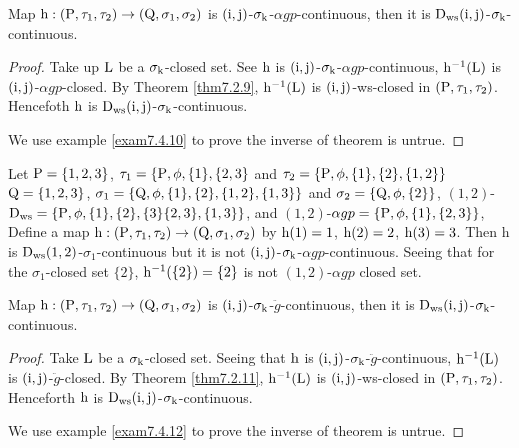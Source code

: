 \begin{thm}\label{thm7.4.9}
Map $\mathrm{h} :(\mathrm{P}, \tau_1, \tau_2 )\to (\mathrm{Q}, \sigma_{1}, \sigma_{2} )$ is $(\mathrm{i}, \mathrm{j})$-$\sigma_{\mathrm{k}}$-$\alpha gp$-continuous, then it is $\mathrm{D}_{\mathrm{ws}} (\mathrm{i}, \mathrm{j})$-$\sigma_{\mathrm{k}}$-continuous.
\end{thm}

\begin{proof}
Take up $\mathrm{L}$ be a $\sigma_{\mathrm{k}}$-closed set. See $\mathrm{h}$ is $(\mathrm{i}, \mathrm{j})$-$\sigma_{\mathrm{k}}$-$\alpha gp$-continuous, $\mathrm{h}^{-1} (\mathrm{L})$ is $(\mathrm{i}, \mathrm{j})$-$\alpha gp$-closed. By Theorem \ref{thm7.2.9}, $\mathrm{h}^{-1} (\mathrm{L})$ is $(\mathrm{i}, \mathrm{j})$-ws-closed in $(\mathrm{P}, \tau_1, \tau_2 )$. Hencefoth $\mathrm{h}$ is $\mathrm{D}_{\mathrm{ws}} (\mathrm{i}, \mathrm{j})$-$\sigma_{\mathrm{k}}$-continuous.

We use example \ref{exam7.4.10} to prove the inverse of theorem is untrue.
\end{proof}

\begin{exm}\label{exam7.4.10}
Let $\mathrm{P}=\{1,2,3\}$, $\tau_1 =\{\mathrm{P}, \phi, \{1\},\{2,3\}$ and $\tau_2 =\{\TSP, \phi, \{1\},\{2\},\break \{1,2\}\}$ $\mathrm{Q}=\{1,2,3\}$, $\sigma_{1} =\{\mathrm{Q},\phi,\{1\},\{2\},\{1,2\},\{1,3\}\}$ and $\sigma_{2} =\{\mathrm{Q},\phi, \{2\}\}$, $(1,2)$-$\mathrm{D}_{\mathrm{ws}} =\{\mathrm{P}, \phi, \{1\},\{2\},\{3\}\{2,3\},\{1,3\}\}$, and $(1,2)$-$\alpha gp =\{\mathrm{P}, \phi, \{1\},\{2,3\}\}$, Define a map $\mathrm{h}: (\mathrm{P}, \tau_1, \tau_2 )\to (\mathrm{Q}, \sigma_{1}, \sigma_{2} )$ by $\mathrm{h}(1)=1$, $\mathrm{h}(2)=2$, $\mathrm{h}(3)=3$. Then h is $\mathrm{D}_{\mathrm{ws}} (1, 2)$-$\sigma_{1}$-continuous but it is not $(\mathrm{i}, \mathrm{j})$-$\sigma_{\mathrm{k}}$-$\alpha gp$-continuous. Seeing that for the $\sigma_{1}$-closed set $\{2\}$, $\mathrm{h}^{-1} (\{2\})=\{2\}$ is not $(1, 2)$-$\alpha gp$ closed set.
\end{exm}

\begin{thm}\label{thm7.4.11}
Map $\mathrm{h}:(\mathrm{P}, \tau_1, \tau_2 )\to (\mathrm{Q}, \sigma_{1}, \sigma_{2} )$ is $(\mathrm{i}, \mathrm{j})$-$\sigma_{\mathrm{k}}$-$\ddot{g}$-continuous, then it is $\mathrm{D}_{\mathrm{ws}} (\mathrm{i}, \mathrm{j})$-$\sigma_{\mathrm{k}}$-continuous.
\end{thm}

\begin{proof}
Take $\mathrm{L}$ be a $\sigma_{\mathrm{k}}$-closed set. Seeing that $\mathrm{h}$ is $(\mathrm{i}, \mathrm{j})$-$\sigma_{\mathrm{k}}$-$\ddot{g}$-continuous, $\mathrm{h}^{-1} (\mathrm{L})$ is $(\mathrm{i}, \mathrm{j})$-$\ddot{g}$-closed. By Theorem \ref{thm7.2.11}, $\mathrm{h}^{-1} (\mathrm{L})$ is $(\mathrm{i}, \mathrm{j})$-ws-closed in $(\mathrm{P}, \tau_1, \tau_2 )$. Henceforth $\mathrm{h}$ is $\mathrm{D}_{\mathrm{ws}} (\mathrm{i}, \mathrm{j})$-$\sigma_{\mathrm{k}}$-continuous.

We use example \ref{exam7.4.12} to prove the inverse of theorem is untrue.
\end{proof}

